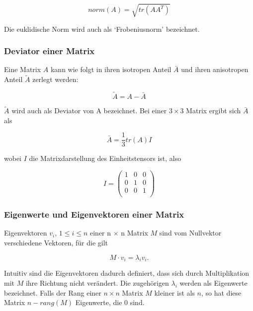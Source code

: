 \documentclass[a4paper,fontsize=12pt,toc=bib,halfparskip,ngerman]{scrartcl}
\begin{document}
\begin{equation}
	norm(A) = \sqrt{tr(AA^T)}
\end{equation}

Die euklidische Norm wird auch als `Frobeniusnorm' bezeichnet.

\subsubsection{Deviator einer Matrix}
Eine Matrix $A$ kann wie folgt in ihren isotropen Anteil $\bar{A}$ und ihren anisotropen Anteil $\tilde{A}$ zerlegt werden:

\begin{equation}
\tilde{A} = A - \bar{A}
\end{equation}

$\tilde{A}$ wird auch als Deviator von A bezeichnet. Bei einer $3\times 3$ Matrix ergibt sich $\bar{A}$ als

\begin{equation}
\bar{A} = \frac{1}{3}tr(A)I
\end{equation}

wobei $I$ die Matrixdarstellung des Einheitstensors ist, also

\begin{equation}
	I = 	
	\begin{pmatrix}
		1 & 0 & 0 \\
		0 & 1 & 0 \\
		0 & 0 & 1 \\
	\end{pmatrix}
\end{equation}

\subsubsection{Eigenwerte und Eigenvektoren einer Matrix}

Eigenvektoren $v_i$, $1\leq i\leq n$ einer n $\times$ n Matrix $M$ sind vom Nullvektor verschiedene Vektoren, f\"ur die gilt

\begin{equation}
	M \cdot v_i = \lambda_i v_i.
\end{equation}

Intuitiv sind die Eigenvektoren dadurch definiert, dass sich durch Multiplikation mit $M$ ihre Richtung nicht ver\"andert. Die zugeh\"origen $\lambda_i$ werden als Eigenwerte bezeichnet.
Falls der Rang einer $n\times n$ Matrix $M$ kleiner ist als $n$, so hat diese Matrix $n - rang(M)$ Eigenwerte, die 0 sind.
\end{document}
